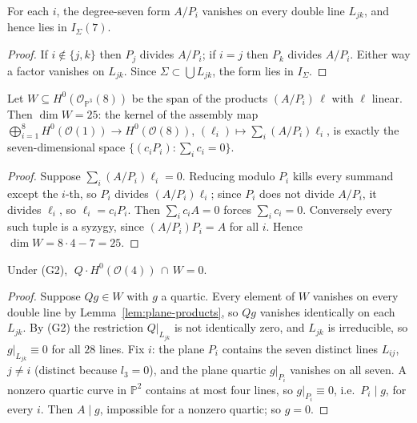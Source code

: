 \begin{lemma}\label{lem:plane-products}
For each $i$, the degree-seven form $A/P_i$ vanishes on every double line
$L_{jk}$, and hence lies in $I_\Sigma(7)$.
\end{lemma}

\begin{proof}
If $i \notin \{j,k\}$ then $P_j$ divides $A/P_i$; if $i = j$ then $P_k$
divides $A/P_i$. Either way a factor vanishes on $L_{jk}$. Since
$\Sigma \subset \bigcup L_{jk}$, the form lies in $I_\Sigma$.
\end{proof}

\begin{lemma}\label{lem:syzygies}
Let $W \subseteq H^0(\mathcal{O}_{\mathbb{P}^3}(8))$ be the span of the
products $(A/P_i)\,\ell$ with $\ell$ linear. Then $\dim W = 25$: the kernel
of the assembly map
$\bigoplus_{i=1}^{8} H^0(\mathcal{O}(1)) \to H^0(\mathcal{O}(8))$,
$(\ell_i) \mapsto \sum_i (A/P_i)\ell_i$, is exactly the seven-dimensional
space $\{(c_i P_i) : \sum_i c_i = 0\}$.
\end{lemma}

\begin{proof}
Suppose $\sum_i (A/P_i)\ell_i = 0$. Reducing modulo $P_i$ kills every
summand except the $i$-th, so $P_i$ divides $(A/P_i)\ell_i$; since $P_i$
does not divide $A/P_i$, it divides $\ell_i$, so $\ell_i = c_i P_i$. Then
$\sum_i c_i A = 0$ forces $\sum_i c_i = 0$. Conversely every such tuple is
a syzygy, since $(A/P_i)P_i = A$ for all $i$. Hence
$\dim W = 8 \cdot 4 - 7 = 25$.
\end{proof}

\begin{lemma}\label{lem:transversal-independence}
Under (G2), $\;Q \cdot H^0(\mathcal{O}(4)) \,\cap\, W = 0$.
\end{lemma}

\begin{proof}
Suppose $Qg \in W$ with $g$ a quartic. Every element of $W$ vanishes on
every double line by Lemma~\ref{lem:plane-products}, so $Qg$ vanishes
identically on each $L_{jk}$. By (G2) the restriction $Q|_{L_{jk}}$ is not
identically zero, and $L_{jk}$ is irreducible, so $g|_{L_{jk}} \equiv 0$
for all $28$ lines. Fix $i$: the plane $P_i$ contains the seven distinct
lines $L_{ij}$, $j \neq i$ (distinct because $l_3 = 0$), and the plane
quartic $g|_{P_i}$ vanishes on all seven. A nonzero quartic curve in
$\mathbb{P}^2$ contains at most four lines, so $g|_{P_i} \equiv 0$, i.e.\
$P_i \mid g$, for every $i$. Then $A \mid g$, impossible for a nonzero
quartic; so $g = 0$.
\end{proof}

